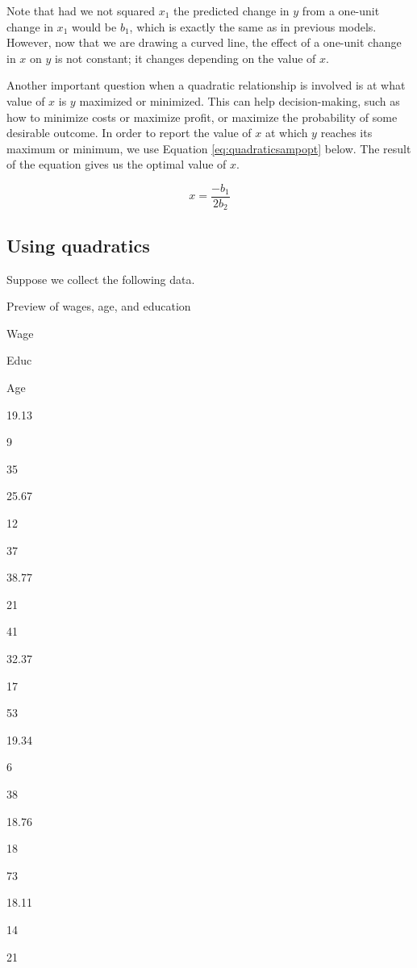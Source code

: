 \documentclass[
]{book}
\begin{document}
Note that had we not squared \(x_1\) the predicted change in \(y\) from a one-unit change in \(x_1\) would be \(b_1\), which is exactly the same as in previous models. However, now that we are drawing a curved line, the effect of a one-unit change in \(x\) on \(y\) is not constant; it changes depending on the value of \(x\).

Another important question when a quadratic relationship is involved is at what value of \(x\) is \(y\) maximized or minimized. This can help decision-making, such as how to minimize costs or maximize profit, or maximize the probability of some desirable outcome. In order to report the value of \(x\) at which \(y\) reaches its maximum or minimum, we use Equation \eqref{eq:quadraticsampopt} below. The result of the equation gives us the optimal value of \(x\).

\begin{equation}
x = {\frac{-b_1}{2b_2}}
\label{eq:quadraticsampopt}
\end{equation}

\hypertarget{using-quadratics}{%
\subsection{Using quadratics}\label{using-quadratics}}

Suppose we collect the following data.

\label{tab:wagestab}Preview of wages, age, and education

Wage

Educ

Age

19.13

9

35

25.67

12

37

38.77

21

41

32.37

17

53

19.34

6

38

18.76

18

73

18.11

14

21
\end{document}
